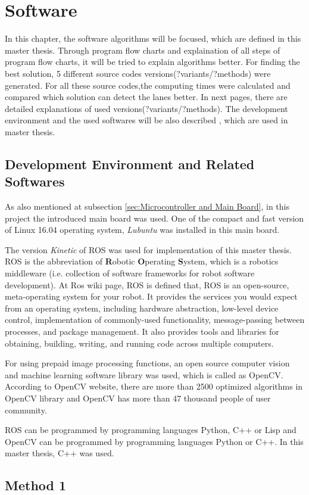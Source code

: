 %
\section{Software}\label{sec:Software}


In this chapter, the software algorithms will be focused, which are defined in this master thesis.  Through program flow charts and explaination of all steps of program flow charts, it will be tried to explain algorithms better. For finding the best solution, 5 different source codes versions(?variants/?methods) were generated. For all these source codes,the computing times were calculated and compared which solution can detect the lanes better. In next pages, there are detailed explanations of used versions(?variants/?methods). The development environment and the used softwares will be also described , which are used in master thesis.

\subsection{Development Environment and Related Softwares}
\label{sec:Development Environment and Related Softwares}

As also mentioned at subsection \ref{sec:Microcontroller and Main Board}, in this project the introduced main board was used. One of the compact and fast version of Linux 16.04 operating system, \textit{Lubuntu} was installed in this main board.

The version \textit{Kinetic} of ROS was used for implementation of this master thesis. ROS is the abbreviation of \textbf{R}obotic \textbf{O}perating \textbf{S}ystem, which is a robotics middleware (i.e. collection of software frameworks for robot software development). At Ros wiki page\cite{ROS}, ROS is defined that, ROS is an open-source, meta-operating system for your robot. It provides the services you would expect from an operating system, including hardware abstraction, low-level device control, implementation of commonly-used functionality, message-passing between processes, and package management. It also provides tools and libraries for obtaining, building, writing, and running code across multiple computers.

For using prepaid image processing functions, an open source computer vision and machine learning software library was used, which is called as OpenCV. According to OpenCV website\cite{OpenCV}, there are more than 2500 optimized algorithms in OpenCV library and OpenCV has more than 47 thousand people of user community.

ROS can be programmed by programming languages Python, C++ or Lisp and OpenCV can be programmed by programming languages Python or C++. In this master thesis, C++ was used.

\subsection{Method 1}\label{sec:Method 1}




 
%


